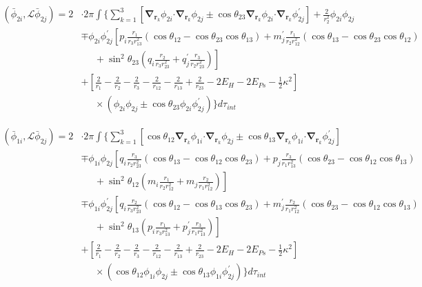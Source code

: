 \documentclass[Dissertation.tex]{subfiles}
\begin{document}
\begin{align}
\label{eq:PWavePhi2Phi2}
\left(\bar{\phi}_{2i},\mathcal{L} \bar{\phi}_{2j}\right) = 2 & \cdot 2\pi \int \Bigg\{ \sum_{k=1}^3 \left[ \boldsymbol{\nabla}_{\!\mathbf{r}_k} \nonumber \phi_{2i} \boldsymbol{\cdot} \boldsymbol{\nabla}_{\!\mathbf{r}_k} \phi_{2j} \pm \cos\theta_{23} \boldsymbol{\nabla}_{\!\mathbf{r}_k} \phi_{2i} \boldsymbol{\cdot} \boldsymbol{\nabla}_{\!\mathbf{r}_k} \phi_{2j}^\prime \right]  + \frac{2}{r_2^2}\phi_{2i}\phi_{2j} \\
 \nonumber &\mp \phi_{2i} \phi_{2j}^\prime \left[p_i \frac{r_1}{r_3 r_{13}^2} (\cos\theta_{12} - \cos\theta_{23} \cos\theta_{13}) + m_j^\prime \frac{r_1}{r_2 r_{12}^2}(\cos\theta_{13}-\cos\theta_{23} \cos\theta_{12})\right.\\
 \nonumber & \left. \;\;\;\;\;  + \sin^2\theta_{23} \left(q_i \frac{r_2}{r_3 r_{23}^2} + q_j^\prime \frac{r_3}{r_2 r_{23}^2} \right) \right] \\
 \nonumber &+ \left. \left[\frac{2}{r_1} - \frac{2}{r_2} - \frac{2}{r_3} - \frac{2}{r_{12}} - \frac{2}{r_{13}} + \frac{2}{r_{23}} - 2 E_H - 2 E_{Ps} - \frac{1}{2}\kappa^2 \right] \right. \\
 &\;\;\;\;\; \times \left(\phi_{2i} \phi_{2j} \pm \cos\theta_{23} \phi_{2i} \phi_{2j}^\prime \right) \Bigg\} d\tau_{int}
\end{align}

\begin{align}
\label{eq:PWavePhi1Phi2}
\left(\bar{\phi}_{1i},\mathcal{L} \bar{\phi}_{2j}\right) = 2 & \cdot 2\pi \int \Bigg\{ \sum_{k=1}^3 \left[ \cos\theta_{12} \boldsymbol{\nabla}_{\!\mathbf{r}_k} \nonumber \phi_{1i} \boldsymbol{\cdot} \boldsymbol{\nabla}_{\!\mathbf{r}_k} \phi_{2j} \pm \cos\theta_{13} \boldsymbol{\nabla}_{\!\mathbf{r}_k} \phi_{1i} \boldsymbol{\cdot} \boldsymbol{\nabla}_{\!\mathbf{r}_k} \phi_{2j}^\prime \right] \\
 \nonumber &\mp \phi_{1i} \phi_{2j} \left[q_i \frac{r_3}{r_2 r_{23}^2} (\cos\theta_{13} - \cos\theta_{12} \cos\theta_{23}) + p_j \frac{r_3}{r_1 r_{13}^2}(\cos\theta_{23}-\cos\theta_{12} \cos\theta_{13})\right.\\
 \nonumber & \left. \;\;\;\;\;  + \sin^2\theta_{12} \left(m_i \frac{r_1}{r_2 r_{12}^2} + m_j \frac{r_2}{r_1 r_{12}^2} \right) \right] \\
 \nonumber &\mp \phi_{1i} \phi_{2j}^\prime \left[q_i \frac{r_2}{r_3 r_{23}^2} (\cos\theta_{12} - \cos\theta_{13} \cos\theta_{23}) + m_j^\prime \frac{r_2}{r_1 r_{12}^2}(\cos\theta_{23}-\cos\theta_{12} \cos\theta_{13})\right.\\
 \nonumber & \left. \;\;\;\;\;  + \sin^2\theta_{13} \left(p_i \frac{r_1}{r_3 r_{13}^2} + p_j^\prime \frac{r_3}{r_1 r_{13}^2} \right) \right] \\
 \nonumber &+ \left. \left[\frac{2}{r_1} - \frac{2}{r_2} - \frac{2}{r_3} - \frac{2}{r_{12}} - \frac{2}{r_{13}} + \frac{2}{r_{23}} - 2 E_H - 2 E_{Ps} - \frac{1}{2}\kappa^2 \right] \right. \\
 &\;\;\;\;\; \times \left(\cos\theta_{12} \phi_{1i} \phi_{2j} \pm \cos\theta_{13} \phi_{1i} \phi_{2j}^\prime \right) \Bigg\} d\tau_{int}
\end{align}
\end{document}
